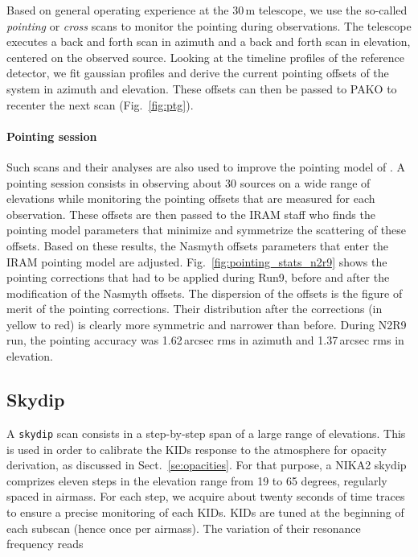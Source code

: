 Based on general operating experience at the 30\,m telescope, we use the so-called
{\em pointing} or {\em cross} scans to monitor the pointing during observations. The
telescope executes a back and forth scan in azimuth and a back and forth scan in
elevation, centered on the observed source. Looking at the timeline profiles of
the reference detector, we fit gaussian profiles and derive the current pointing
offsets of the system in azimuth and elevation. These offsets can then be passed
to PAKO to recenter the next scan (Fig.~\ref{fig:ptg}).

\paragraph{Pointing session}
\label{se:pointing_session}

Such scans and their analyses are also used to improve the pointing model of
\nika. A pointing session consists in observing about 30 sources on a wide range
of elevations  while monitoring the pointing offsets
that are measured for each observation. These offsets are then passed to the
IRAM staff who finds the pointing model parameters that minimize and symmetrize
the scattering of these offsets. Based on these results, the Nasmyth offsets
parameters that enter the IRAM pointing model are
adjusted. Fig.~\ref{fig:pointing_stats_n2r9} shows the pointing corrections that
had to be applied during Run9, before and after the modification of the Nasmyth
offsets. The dispersion of the offsets is the figure of merit of the pointing
corrections. Their distribution after the corrections (in yellow to red) is
clearly more symmetric and narrower than before. During N2R9 run, the pointing
accuracy was 1.62\,arcsec rms in azimuth and 1.37\,arcsec rms in elevation.

\subsection{Skydip}
\label{se:skydip}

A {\tt skydip} scan  consists in a step-by-step span
of a large range of elevations. This is used in order to calibrate the
KIDs response to the atmosphere for opacity derivation, as discussed in
Sect.~\ref{se:opacities}.
For that purpose, a NIKA2 skydip comprizes eleven steps in
the elevation range from 19 to 65 degrees, regularly spaced in
airmass. For each step, we acquire about twenty seconds of time traces
to ensure a precise monitoring of each KIDs. KIDs are tuned at the beginning of
each subscan (hence once per airmass). The variation of their resonance
frequency reads

